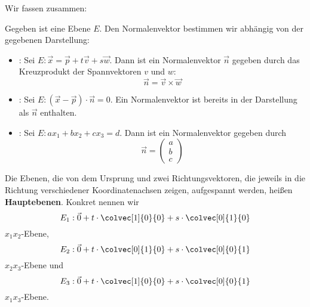 Wir fassen zusammen: 
\begin{problem}
    Gegeben ist eine Ebene \(E\). Den Normalenvektor bestimmen wir abhängig von der gegebenen Darstellung: 
    \begin{itemize}
        \item {}: Sei \(E: \vec x = \vec p + t\vec v + s\vec w\). Dann ist ein Normalenvektor \(\vec n\) gegeben durch das Kreuzprodukt der Spannvektoren \(v\) und \(w\): \begin{equation*}
            \vec n = \vec v \times \vec w
        \end{equation*}

        \item {}: Sei \(E: (\vec x - \vec p)\cdot \vec n = 0\). Ein Normalenvektor ist bereits in der Darstellung als \(\vec n\) enthalten. 

        \item {}: Sei \(E: ax_1 + bx_2 + cx_3 = d\). Dann ist ein Normalenvektor gegeben durch \begin{equation*}
            \vec n = \begin{pmatrix}
                a \\ b \\ c
            \end{pmatrix}
        \end{equation*}
    \end{itemize}
\end{problem}

\begin{definition}[Hauptebenen]
    Die Ebenen, die von dem Ursprung und zwei Richtungsvektoren, die jeweils in die Richtung verschiedener Koordinatenachsen zeigen, aufgespannt werden, heißen \textbf{Hauptebenen}. Konkret nennen wir 
    \begin{equation*}
        E_1 : \vec 0 + t\cdot \colvec[1]{0}{0} + s \cdot \colvec[0]{1}{0}
    \end{equation*}
    \(x_1x_2\)-Ebene, 
    \begin{equation*}
        E_2 : \vec 0 + t \cdot \colvec[0]{1}{0} + s \cdot \colvec[0]{0}{1}
    \end{equation*}
    \(x_2x_3\)-Ebene und 
    \begin{equation*}
        E_3 : \vec 0 + t\cdot \colvec[1]{0}{0} + s \cdot \colvec[0]{0}{1}
    \end{equation*}
    \(x_1x_3\)-Ebene. 
\end{definition}

